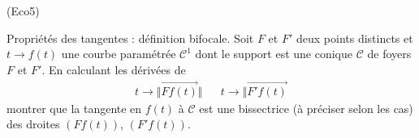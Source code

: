 \begin{tiny}(Eco5)\end{tiny} Propriétés des tangentes : définition bifocale.\newline
Soit $F$ et $F'$ deux points distincts et $t\rightarrow f(t)$ une courbe paramétrée $\mathcal{C}^1$ dont le support est une conique $\mathcal C$ de foyers $F$ et $F'$. En calculant les dérivées de
\begin{align*}
 t\rightarrow \Vert \overrightarrow{Ff(t)}\Vert & &
 t\rightarrow \Vert \overrightarrow{F'f(t)}
\end{align*}
montrer que la tangente en $f(t)$ à $\mathcal C$ est une bissectrice (à préciser selon les cas) des droites $(Ff(t))$, $(F'f(t))$.
